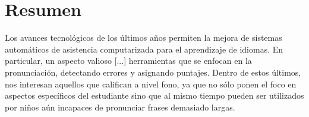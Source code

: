 \chapter*{Resumen}

Los avances tecnológicos de los últimos años permiten la mejora de sistemas
automáticos de asistencia computarizada para el aprendizaje de idiomas. En particular,
un aspecto valioso [...] herramientas que se enfocan en la pronunciación,
detectando errores y asignando puntajes. Dentro de estos últimos, nos interesan
aquellos que califican a nivel fono, ya que
no sólo ponen el foco en aspectos específicos del estudiante sino que al mismo tiempo
pueden ser utilizados por niños aún incapaces de pronunciar frases
demasiado largas.

